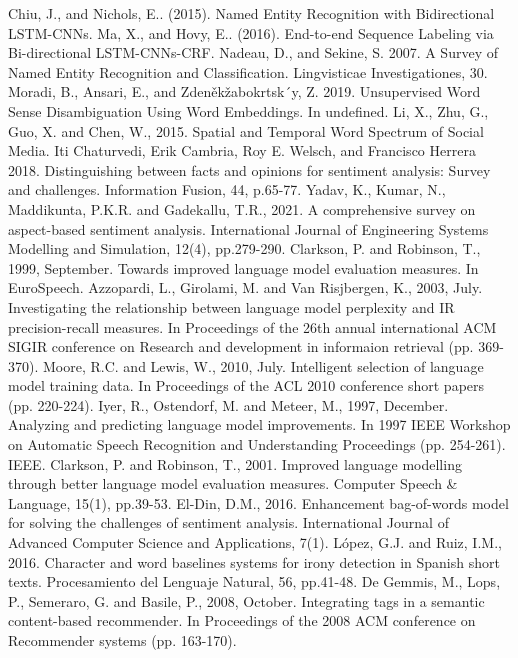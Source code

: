 \documentclass[12pt, conference]{IEEEtran}
\begin{document}
\begin{thebibliography}{00}
   Chiu, J., and Nichols, E.. (2015). Named Entity Recognition with Bidirectional LSTM-CNNs.
   Ma, X., and Hovy, E.. (2016). End-to-end Sequence Labeling via Bi-directional LSTM-CNNs-CRF.
   Nadeau, D., and Sekine, S. 2007. A Survey of Named Entity Recognition and Classification. Lingvisticae Investigationes, 30.
   Moradi, B., Ansari, E., and Zdeněkžabokrtsk´y, Z. 2019. Unsupervised Word Sense Disambiguation Using Word Embeddings. In undefined.
   Li, X., Zhu, G., Guo, X. and Chen, W., 2015. Spatial and Temporal Word Spectrum of Social Media.
   Iti Chaturvedi, Erik Cambria, Roy E. Welsch, and Francisco Herrera 2018. Distinguishing between facts and opinions for sentiment analysis: Survey and challenges. Information Fusion, 44, p.65-77.
   Yadav, K., Kumar, N., Maddikunta, P.K.R. and Gadekallu, T.R., 2021. A comprehensive survey on aspect-based sentiment analysis. International Journal of Engineering Systems Modelling and Simulation, 12(4), pp.279-290.
   Clarkson, P. and Robinson, T., 1999, September. Towards improved language model evaluation measures. In EuroSpeech.
   Azzopardi, L., Girolami, M. and Van Risjbergen, K., 2003, July. Investigating the relationship between language model perplexity and IR precision-recall measures. In Proceedings of the 26th annual international ACM SIGIR conference on Research and development in informaion retrieval (pp. 369-370).
   Moore, R.C. and Lewis, W., 2010, July. Intelligent selection of language model training data. In Proceedings of the ACL 2010 conference short papers (pp. 220-224).
   Iyer, R., Ostendorf, M. and Meteer, M., 1997, December. Analyzing and predicting language model improvements. In 1997 IEEE Workshop on Automatic Speech Recognition and Understanding Proceedings (pp. 254-261). IEEE.
   Clarkson, P. and Robinson, T., 2001. Improved language modelling through better language model evaluation measures. Computer Speech \& Language, 15(1), pp.39-53.
   El-Din, D.M., 2016. Enhancement bag-of-words model for solving the challenges of sentiment analysis. International Journal of Advanced Computer Science and Applications, 7(1).
   López, G.J. and Ruiz, I.M., 2016. Character and word baselines systems for irony detection in Spanish short texts. Procesamiento del Lenguaje Natural, 56, pp.41-48.
   De Gemmis, M., Lops, P., Semeraro, G. and Basile, P., 2008, October. Integrating tags in a semantic content-based recommender. In Proceedings of the 2008 ACM conference on Recommender systems (pp. 163-170).

\end{thebibliography}
\end{document}
